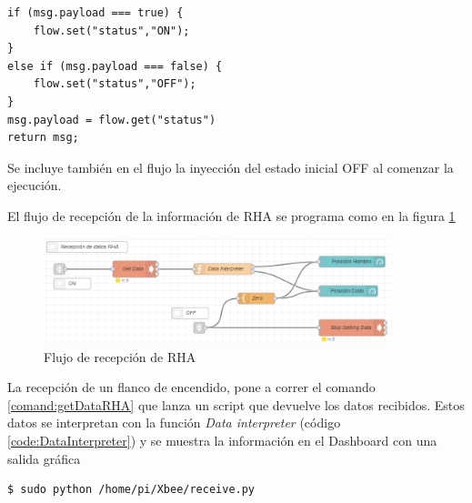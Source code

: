 \lstset{numbers=left,numberstyle=\tiny, language=Java, breaklines=true, basicstyle=\footnotesize, xleftmargin=25pt, framesep=8pt, numbersep=15pt}


\begin{lstlisting}[frame=leftline, caption={FlowVar status}, label=code:FlowVarStatus]
if (msg.payload === true) {
    flow.set("status","ON");
}
else if (msg.payload === false) {
    flow.set("status","OFF");
}
msg.payload = flow.get("status")
return msg;
\end{lstlisting}

Se incluye también en el flujo la inyección del estado inicial OFF al comenzar la ejecución.

El flujo de recepción de la información de RHA se programa como en la figura \ref{fig:RecepcionRHA}

\begin{figure}[H]
\centering
\includegraphics[width=0.9\textwidth]{figuras/RecepcionFlowRHA.png}
\caption{Flujo de recepción de RHA}
\label{fig:RecepcionRHA}
\end{figure}

La recepción de un flanco de encendido, pone a correr el comando \ref{comand:getDataRHA} que lanza un script que devuelve los datos recibidos. Estos datos se interpretan con la función \textit{Data interpreter} (código \ref{code:DataInterpreter}) y se muestra la información en el Dashboard con una salida gráfica


\begin{lstlisting}[frame=single, label=command:getDataRHA]
$ sudo python /home/pi/Xbee/receive.py
\end{lstlisting}

\lstset{numbers=left,numberstyle=\tiny, language=Java, breaklines=true, basicstyle=\footnotesize, xleftmargin=25pt, framesep=8pt, numbersep=15pt}

